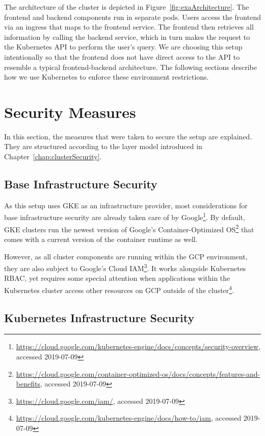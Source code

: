 The architecture of the cluster is depicted in Figure~\ref{fig:exaArchitecture}. The frontend and backend components run in separate pods. Users access the frontend via an ingress that maps to the frontend service. The frontend then retrieves all information by calling the backend service, which in turn makes the request to the Kubernetes API to perform the user's query. We are choosing this setup intentionally so that the frontend does not have direct access to the API to resemble a typical frontend-backend architecture. The following sections describe how we use Kubernetes to enforce these environment restrictions.

\section{Security Measures}

In this section, the measures that were taken to secure the setup are explained. They are structured according to the layer model introduced in Chapter~\ref{chap:clusterSecurity}.

\subsection{Base Infrastructure Security}

As this setup uses \ac{GKE} as an infrastructure provider, most considerations for base infrastructure security are already taken care of by Google\footnote{\url{https://cloud.google.com/kubernetes-engine/docs/concepts/security-overview}, accessed 2019-07-09}. By default, \ac{GKE} clusters run the newest version of Google's Container-Optimized OS\footnote{\url{https://cloud.google.com/container-optimized-os/docs/concepts/features-and-benefits}, accessed 2019-07-09} that comes with a current version of the container runtime as well. 

However, as all cluster components are running within the \ac{GCP} environment, they are also subject to Google's Cloud \ac{IAM}\footnote{\url{https://cloud.google.com/iam/}, accessed 2019-07-09}. It works alongside Kubernetes \ac{RBAC}, yet requires some special attention when applications within the Kubernetes cluster access other resources on \ac{GCP} outside of the cluster\footnote{\url{https://cloud.google.com/kubernetes-engine/docs/how-to/iam}, accessed 2019-07-09}.

\subsection{Kubernetes Infrastructure Security}

